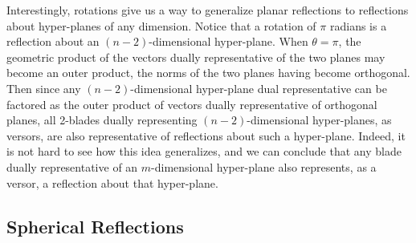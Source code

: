 \documentclass[12pt]{article}
\begin{document}
Interestingly, rotations give us a way to generalize planar reflections
to reflections about hyper-planes of any dimension.  Notice that
a rotation of $\pi$ radians is a reflection about an $(n-2)$-dimensional
hyper-plane.  When $\theta=\pi$, the geometric product of the
vectors dually representative of the two planes may become an outer product,
the norms of the two planes having become orthogonal.  Then since
any $(n-2)$-dimensional hyper-plane dual representative can be factored as the
outer product of vectors dually representative of orthogonal planes,
all 2-blades dually representing $(n-2)$-dimensional hyper-planes, as versors,
are also representative of reflections about such a hyper-plane.
Indeed, it is not hard to see how this idea generalizes, and we can
conclude that any blade dually representative of an $m$-dimensional
hyper-plane also represents, as a versor, a reflection about that
hyper-plane.

\subsection{Spherical Reflections}\label{sec_spherical_reflections}
\end{document}

